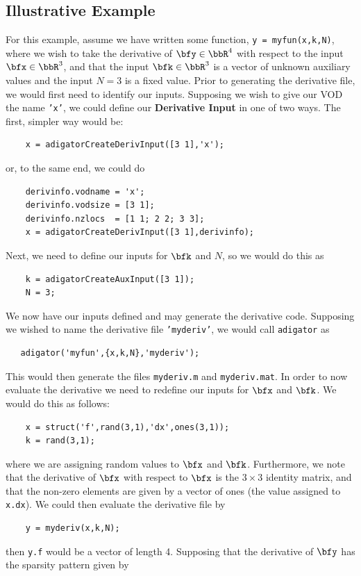 \documentclass[10pt,pdftex]{article}
\begin{document}
\subsection{Illustrative Example}
For this example, assume we have written some function, \texttt{y = myfun(x,k,N)}, where we wish to take the derivative of $\bfy \in \bbR^4$ with respect to the input $\bfx \in \bbR^3$, and that the input $\bfk \in \bbR^3$ is a vector of unknown auxiliary values and the input $N = 3$ is a fixed value. Prior to generating the derivative file, we would first need to identify our inputs. Supposing we wish to give our VOD the name \texttt{'x'}, we could define our {\bf Derivative Input} in one of two ways. The first, simpler way would be:
\begin{verbatim}
    x = adigatorCreateDerivInput([3 1],'x');
\end{verbatim}
or, to the same end, we could do
\begin{verbatim}
    derivinfo.vodname = 'x';
    derivinfo.vodsize = [3 1];
    derivinfo.nzlocs  = [1 1; 2 2; 3 3];
    x = adigatorCreateDerivInput([3 1],derivinfo);
\end{verbatim}
Next, we need to define our inputs for $\bfk$ and $N$, so we would do this as
\begin{verbatim}
    k = adigatorCreateAuxInput([3 1]);
    N = 3;
\end{verbatim}
We now have our inputs defined and may generate the derivative code. Supposing we wished to name the derivative file \texttt{'myderiv'}, we would call \texttt{adigator} as
\begin{verbatim}
   adigator('myfun',{x,k,N},'myderiv');
\end{verbatim}
This would then generate the files \texttt{myderiv.m} and \texttt{myderiv.mat}. In order to now evaluate the derivative we need to redefine our inputs for $\bfx$ and $\bfk$. We would do this as follows:
\begin{verbatim}
    x = struct('f',rand(3,1),'dx',ones(3,1));
    k = rand(3,1);
\end{verbatim}
where we are assigning random values to $\bfx$ and $\bfk$. Furthermore, we note  that the derivative of $\bfx$ with respect to $\bfx$ is the $3\times 3$ identity matrix, and that the non-zero elements are given by a vector of ones (the value assigned to \texttt{x.dx}). We could then evaluate the derivative file by
\begin{verbatim}
    y = myderiv(x,k,N);
\end{verbatim}
then \texttt{y.f} would be a vector of length 4. Supposing that the derivative of $\bfy$ has the sparsity pattern given by
\end{document}
